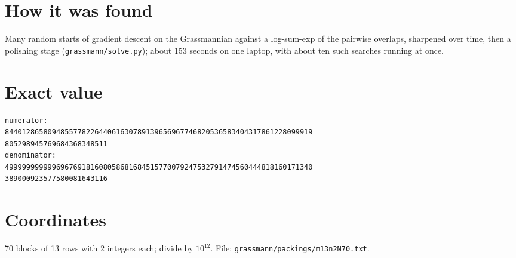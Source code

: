 \documentclass[11pt,a4paper]{article}
\begin{document}
\section{How it was found}
Many random starts of gradient descent on the Grassmannian against a log-sum-exp of the pairwise overlaps, sharpened over time, then a polishing stage (\texttt{grassmann/solve.py}); about 153 seconds on one laptop, with about ten such searches running at once.


\appendix
\section{Exact value}
{\small
\begin{verbatim}
numerator:
844012865809485577822644061630789139656967746820536583404317861228099919
805298945769684368348511
denominator:
499999999999696769181608058681684515770079247532791474560444818160171340
389000923577580081643116
\end{verbatim}}

\section{Coordinates}
70 blocks of 13 rows with 2 integers each; divide by $10^{12}$. File: \texttt{grassmann/packings/m13n2N70.txt}.
{\tiny
\begin{multicols}{4}
\end{multicols}}
\end{document}
